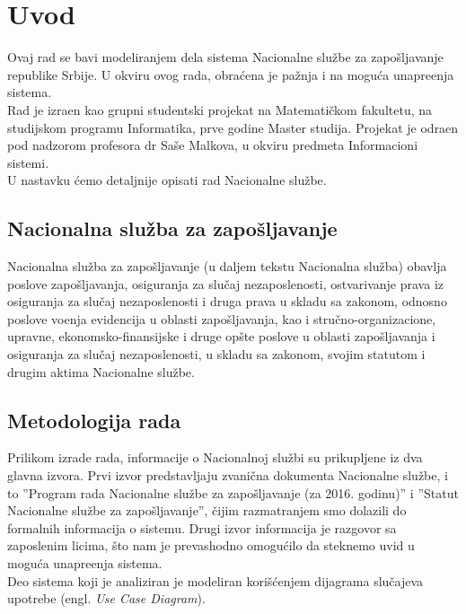 \section{Uvod}

Ovaj rad se bavi modeliranjem dela sistema Nacionalne slu\v zbe za zapo\v sljavanje republike Srbije. U okviru ovog rada, obra\' cena je pa\v znja i na mogu\' ca unapre\dj enja sistema.\\

Rad je izra\dj en kao grupni studentski projekat na Matemati\v ckom fakultetu, na studijskom programu Informatika, prve godine Master studija. Projekat je odra\dj en pod nadzorom profesora dr Sa\v se Malkova, u okviru predmeta Informacioni sistemi.\\

U nastavku \' cemo detaljnije opisati rad Nacionalne slu\v zbe.

\subsection{Nacionalna slu\v zba za zapo\v sljavanje}

Nacionalna slu\v zba za zapo\v sljavanje (u daljem tekstu Nacionalna slu\v zba) obavlja poslove zapo\v sljavanja, osiguranja za slu\v caj nezaposlenosti, ostvarivanje prava iz osiguranja za slu\v caj nezaposlenosti i druga prava u skladu sa zakonom, odnosno poslove vo\dj enja evidencija u oblasti zapo\v sljavanja, kao i stru\v cno-organi\-zacione, upravne, ekonomsko-finansijske i druge op\v ste poslove u oblasti zapo\v sljavanja i osiguranja za slu\v caj nezaposlenosti, u skladu sa zakonom, svojim statutom i drugim aktima Nacionalne slu\v zbe.

\subsection{Metodologija rada}

Prilikom izrade rada, informacije o Nacionalnoj slu\v zbi su prikupljene iz dva glavna izvora. Prvi izvor predstavljaju zvani\v cna dokumenta Nacionalne slu\v zbe, i to ''Program rada Nacionalne slu\v zbe za zapo\v sljavanje (za 2016. godinu)'' i ''Statut Nacionalne slu\v zbe za zapo\v sljavanje'', \v cijim razmatranjem smo dolazili do formalnih informacija o sistemu. Drugi izvor informacija je razgovor sa zaposlenim licima, \v sto nam je prevashodno omogu\' cilo da steknemo uvid u mogu\' ca unapre\dj enja sistema.\\

Deo sistema koji je analiziran je modeliran kori\v s\' cenjem dijagrama slu\v cajeva upotrebe (engl. \textit{Use Case Diagram}).

\newpage